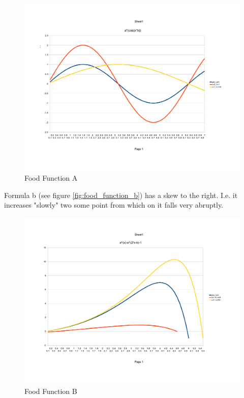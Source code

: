 \documentclass[pdflatex,a4paper,11pt,english]{scrreprt}
\begin{document}
\begin{figure}[htb]
\centering
\includegraphics[scale=0.4]{images/food_function_a}
\caption{Food Function A}
\label{fig:food_function_a}
\end{figure}

\newpage

Formula b (see figure \vref{fig:food_function_b}) has a skew to the right. I.e.
it increases "slowly" two some point from which on it falls very abruptly. 

\begin{figure}[htb]
\centering
\includegraphics[scale=0.4]{images/food_function_b}
\caption{Food Function B}
\label{fig:food_function_b}
\end{figure}
\end{document}
